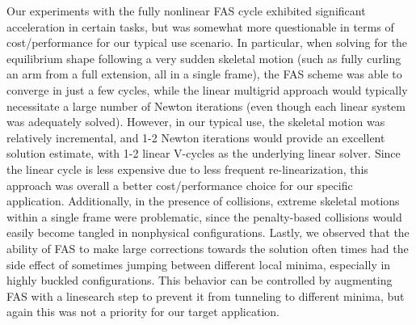 Our experiments with the fully nonlinear FAS cycle exhibited significant acceleration in certain tasks, but was somewhat more questionable in terms of cost/performance for our typical
use scenario. In particular, when solving for the equilibrium shape following a very sudden skeletal motion (such as fully curling an arm from a full extension, all in a single frame),
the FAS scheme was able to converge in just a few cycles, while the linear multigrid approach would typically necessitate a large number of Newton iterations (even though each linear
system was adequately solved). However, in our typical use, the skeletal motion was relatively incremental, and 1-2 Newton iterations would provide an excellent solution estimate, with
1-2 linear V-cycles as the underlying linear solver. Since the linear cycle is less expensive due to less frequent re-linearization, this approach was overall a better cost/performance
choice for our specific application. Additionally, in the presence of collisions, extreme skeletal motions within a single frame were problematic, since the penalty-based collisions
would easily become tangled in nonphysical configurations. Lastly, we observed that the ability of FAS to make large corrections towards the solution often times had the side effect of
sometimes jumping between different local minima, especially in highly buckled configurations. This behavior can be controlled by augmenting FAS with a linesearch step to prevent it
from tunneling to different minima, but again this was not a priority for our target application.
